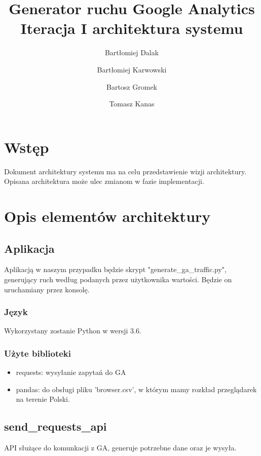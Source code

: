 \documentclass{article}
\title{Generator ruchu Google Analytics \\ Iteracja I architektura systemu}
\author{Bartłomiej Dalak \and Bartłomiej Karwowski \and Bartosz Gromek \and Tomasz Kanas}
\begin{document}
\maketitle

\section{Wstęp}

Dokument architektury systemu ma na celu przedstawienie wizji architektury. Opisana architektura może ulec zmianom w fazie implementacji.

\section{Opis elementów architektury}

\subsection{Aplikacja}

Aplikacją w naszym przypadku będzie skrypt "generate\_ga\_traffic.py", generujący ruch według podanych przez użytkownika wartości. Będzie on uruchamiany przez konsolę.

\subsubsection{Język}

Wykorzystany zostanie Python w wersji 3.6.

\subsubsection{Użyte biblioteki}

\begin{itemize}
\item requests: wysyłanie zapytań do GA
\item pandas: do obsługi pliku 'browser.csv', w którym mamy rozkład przeglądarek na terenie Polski.
\end{itemize}

\subsection{send\_requests\_api}
API służące do komunkacji z GA, generuje potrzebne dane oraz je wysyła.
\end{document}
